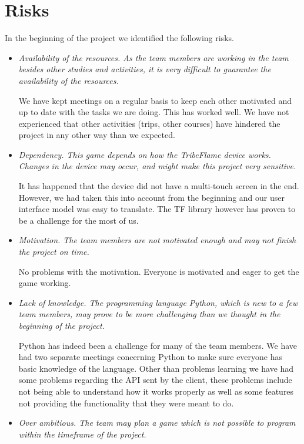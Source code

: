 \documentclass[12pt,a4paper]{article}
\begin{document}
\section{Risks}

In the beginning of the project we identified the following risks.

\begin{itemize}
\item \textit{Availability of the resources. As the team members are working in the team besides other studies and activities, it is very difficult to guarantee the availability of the resources.}

We have kept meetings on a regular basis to keep each other motivated and up to date with the tasks we are doing. This has worked well. We have not experienced that other activities (trips, other courses) have hindered the project in any other way than we expected.
\item \textit{Dependency. This game depends on how the TribeFlame device works. Changes in the device may occur, and might make this project very sensitive.}

It has happened that the device did not have a multi-touch screen in
the end. However, we had taken this into account from the beginning and
our user interface model was easy to translate. The TF library however
has proven to be a challenge for the most of us.

\item \textit{Motivation. The team members are not motivated enough and may not finish the project on time.}

No problems with the motivation. Everyone is motivated and eager to get the game working.

\item \textit{Lack of knowledge. The programming language Python, which is new to a few team members, may prove to be more challenging than we thought in the beginning of the project.}

Python has indeed been a challenge for many of the team members. We have had two separate meetings concerning Python to make sure everyone has basic knowledge of the language. Other than problems learning we have had some problems regarding the API sent by the client, these problems include not being able to understand how it works properly as well as some features not providing the functionality that they were meant to do.

\item \textit{Over ambitious. The team may plan a game which is not possible to program within the timeframe of the project.}


\end{itemize}
\end{document}
